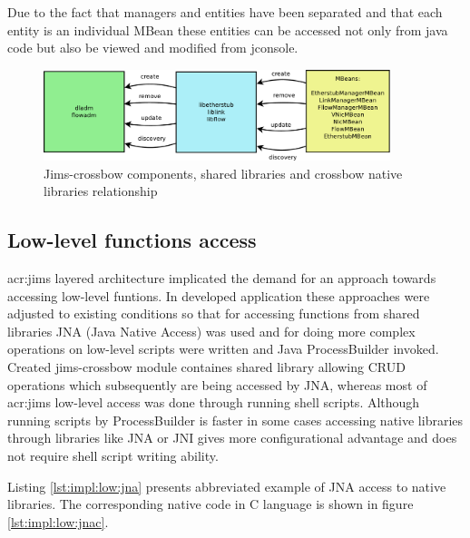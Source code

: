 \documentclass[11pt]{book}
\begin{document}
		Due to the fact that managers and entities have been separated and that each entity is an individual MBean these
		entities can be accessed not only from java code but also be viewed and modified from jconsole.

		\begin{figure}[H]
			\begin{center}
			\includegraphics[width=0.9\textwidth]{img/impl/crossbowLibsDiagram.pdf}
			\end{center}
			\caption{Jims-crossbow components, shared libraries and crossbow native libraries relationship}
		\end{figure} 
		
		\subsection{Low-level functions access}
			\label{sec:impl:low}

			\gls{acr:jims} layered architecture implicated the demand for an approach towards accessing low-level funtions. In developed
			application these approaches were adjusted to existing conditions so that for accessing functions from shared
			libraries JNA (Java Native Access) was used and for doing more complex operations on low-level scripts were
			written and Java ProcessBuilder invoked. Created jims-crossbow module containes shared library allowing CRUD
			operations which subsequently are being accessed by JNA, whereas most of \gls{acr:jims} low-level access was done through
			running shell scripts. Although running scripts by ProcessBuilder is faster in some cases accessing native
			libraries through libraries like JNA or JNI gives more configurational advantage and does not require shell script
			writing ability.

			Listing \ref{lst:impl:low:jna} presents abbreviated example of JNA access to native libraries. The corresponding
			native code in C language is shown in figure \ref{lst:impl:low:jnac}. \\
 	
	
			\noindent
				\begin{minipage}{\textwidth}
				
			\end{minipage}  
\end{document}
